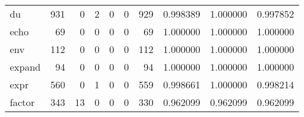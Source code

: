 \begin{tabular}{lrrrrrrrrr}
du        &                                   931 &                                                  0 &                                                  2 &                                                  0 &                                                  0 &                                                929 &                                           0.998389 &                               1.000000 &                             0.997852 \\
echo      &                                    69 &                                                  0 &                                                  0 &                                                  0 &                                                  0 &                                                 69 &                                           1.000000 &                               1.000000 &                             1.000000 \\
env       &                                   112 &                                                  0 &                                                  0 &                                                  0 &                                                  0 &                                                112 &                                           1.000000 &                               1.000000 &                             1.000000 \\
expand    &                                    94 &                                                  0 &                                                  0 &                                                  0 &                                                  0 &                                                 94 &                                           1.000000 &                               1.000000 &                             1.000000 \\
expr      &                                   560 &                                                  0 &                                                  1 &                                                  0 &                                                  0 &                                                559 &                                           0.998661 &                               1.000000 &                             0.998214 \\
factor    &                                   343 &                                                 13 &                                                  0 &                                                  0 &                                                  0 &                                                330 &                                           0.962099 &                               0.962099 &                             0.962099 \\

\end{tabular}
